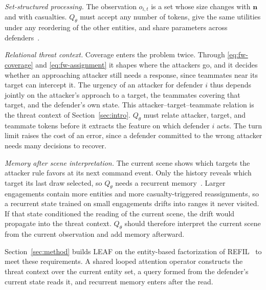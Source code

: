 \emph{Set-structured processing.} The observation $o_{i,t}$ is a set whose size changes with $\mathbf n$ and with casualties. $Q_\theta$ must accept any number of tokens, give the same utilities under any reordering of the other entities, and share parameters across defenders~\cite{zaheer2017deepsets,lee2019settransformer}.

\emph{Relational threat context.} Coverage enters the problem twice. Through \eqref{eq:fw-coverage} and \eqref{eq:fw-assignment} it shapes where the attackers go, and it decides whether an approaching attacker still needs a response, since teammates near its target can intercept it. The urgency of an attacker for defender $i$ thus depends jointly on the attacker's approach to a target, the teammates covering that target, and the defender's own state. This attacker--target--teammate relation is the threat context of Section~\ref{sec:intro}. $Q_\theta$ must relate attacker, target, and teammate tokens before it extracts the feature on which defender $i$ acts. The turn limit raises the cost of an error, since a defender committed to the wrong attacker needs many decisions to recover.

\emph{Memory after scene interpretation.} The current scene shows which targets the attacker rule favors at its next command event. Only the history reveals which target its last draw selected, so $Q_\theta$ needs a recurrent memory~\cite{hausknecht2015drqn}. Larger engagements contain more entities and more casualty-triggered reassignments, so a recurrent state trained on small engagements drifts into ranges it never visited. If that state conditioned the reading of the current scene, the drift would propagate into the threat context. $Q_\theta$ should therefore interpret the current scene from the current observation and add memory afterward.

Section~\ref{sec:method} builds LEAF on the entity-based factorization of REFIL~\cite{iqbal2021refil} to meet these requirements. A shared looped attention operator constructs the threat context over the current entity set, a query formed from the defender's current state reads it, and recurrent memory enters after the read.
